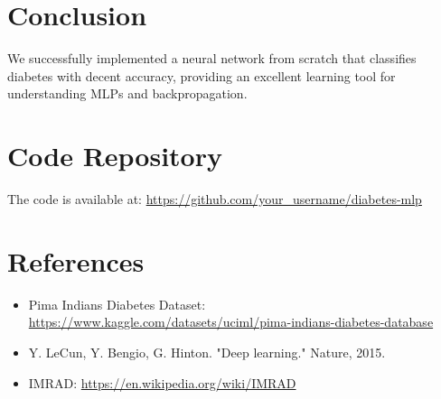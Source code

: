 \documentclass[12pt]{article}
\begin{document}
\section{Conclusion}
We successfully implemented a neural network from scratch that classifies diabetes with decent accuracy, providing an excellent learning tool for understanding MLPs and backpropagation.

\section*{Code Repository}
The code is available at: \url{https://github.com/your_username/diabetes-mlp}

\section*{References}
\begin{itemize}
    \item Pima Indians Diabetes Dataset: \url{https://www.kaggle.com/datasets/uciml/pima-indians-diabetes-database}
    \item Y. LeCun, Y. Bengio, G. Hinton. "Deep learning." Nature, 2015.
    \item IMRAD: \url{https://en.wikipedia.org/wiki/IMRAD}
\end{itemize}
\end{document}
